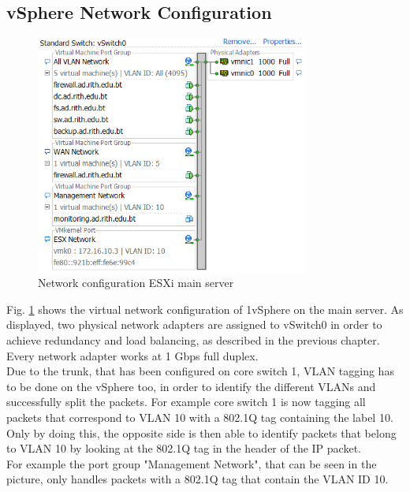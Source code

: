 \subsection{vSphere Network Configuration}

\begin{figure}[H]
	\centering
	\includegraphics[width=0.8\textwidth]{BilderAllgemein/netzwerkkonfiguration_esxi.png}
	\caption{Network configuration ESXi main server}
	\label{img:netzwerkkonfiguration_esxi_main_server}
\end{figure}

Fig. \ref{img:netzwerkkonfiguration_esxi_main_server} shows the virtual network configuration of 1vSphere on the main server. As displayed, two physical network adapters are assigned to vSwitch0 in order to achieve redundancy and load balancing, as described in the previous chapter. Every network adapter works at 1 Gbps full duplex. \\
Due to the trunk, that has been configured on core switch 1, VLAN tagging has to be done on the vSphere too, in order to identify the different VLANs and successfully split the packets. For example core switch 1 is now tagging all packets that correspond to VLAN 10 with a 802.1Q tag containing the label 10. Only by doing this, the opposite side is then able to identify packets that belong to VLAN 10 by looking at the 802.1Q tag in the header of the IP packet. \\
For example the port group "Management Network", that can be seen in the picture, only handles packets with a 802.1Q tag that contain the VLAN ID 10.


